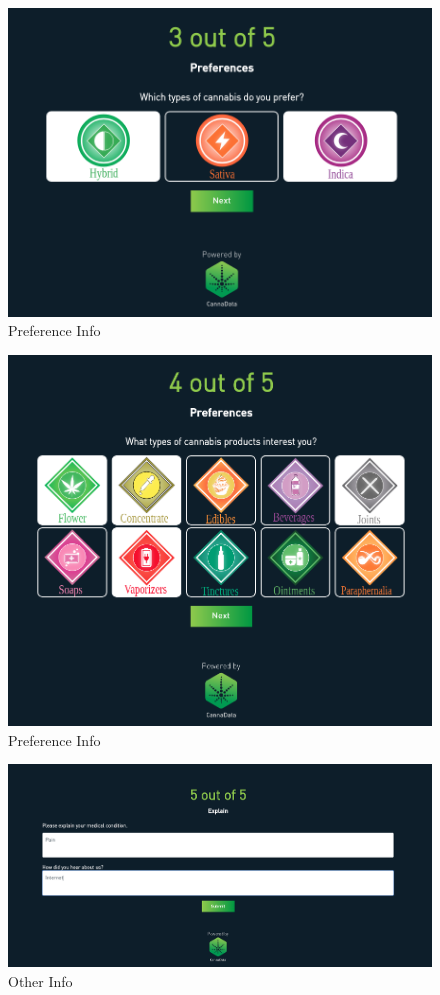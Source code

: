 \documentclass[]{book}
\theoremstyle{definition}
\theoremstyle{definition}
\theoremstyle{definition}
\theoremstyle{remark}
\begin{document}
\begin{figure}
\centering
\includegraphics{images/S2.png}
\caption{Preference Info}
\end{figure}

\begin{figure}
\centering
\includegraphics{images/S3.png}
\caption{Preference Info}
\end{figure}

\begin{figure}
\centering
\includegraphics{images/S5.png}
\caption{Other Info}
\end{figure}
\end{document}
